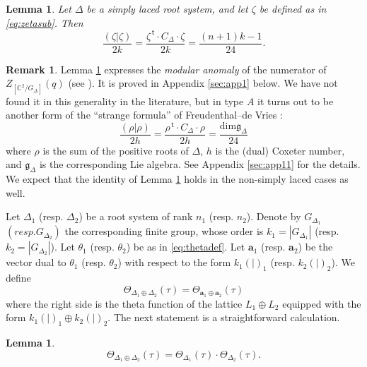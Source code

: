 \documentclass{article}
\newtheorem{lemma}[theorem]{Lemma}
\theoremstyle{definition}
\newtheorem{remark}[theorem]{Remark}
\newcommand{\CC} {{\mathbb C}}          %
\renewcommand{\top}{\,\mathsf{t}}
\begin{document}
\begin{lemma} Let $\Delta$ be a simply laced root system, and let $\zeta$ be 
defined as in \eqref{eq:zetasub}. Then
\[ \frac{(\zeta|\zeta)}{2k}=\frac{\zeta^ {\top} \cdot C_\Delta 
\cdot \zeta}{2k}=\frac{(n+1)k-1}{24}. \]
\label{lem:betalength}
\end{lemma}
\begin{remark}Lemma \ref{lem:betalength} expresses the \emph{modular anomaly} of the 
numerator of $Z_{[ \CC^2/G_\Delta]}(q)$ (see \cite[12.7.5]{kac1994infinite}). It is proved 
in Appendix \ref{sec:app1} below. We have not found it in this generality in the literature, 
but in type $A$ it turns out to be another form of the ``strange formula'' of 
Freudenthal--de Vries \cite{freudenthal1969linear}:
\[ \frac{(\rho|\rho)}{2h}=\frac{\rho^ {\top} \cdot C_\Delta 
\cdot \rho}{2h}=\frac{\mathrm{dim} \mathfrak{g}_{\Delta}}{24} \]
where $\rho$ is the sum of the positive roots of $\Delta$, $h$ is the (dual) Coxeter number, 
and $\mathfrak{g}_{\Delta}$ is the corresponding Lie algebra.
See Appendix \ref{sec:app11} for the details. We expect that the identity of Lemma 
\ref{lem:betalength} holds in the non-simply laced cases as well.
\end{remark}

Let $\Delta_1$ (resp. $\Delta_2$) be a root system of rank $n_1$ (resp. $n_2$). Denote by 
$G_{\Delta_1}$ $(resp. G_{\Delta_2})$ the corresponding finite group, whose order is 
$k_1=|G_{\Delta_1}|$ (resp. $k_2=|G_{\Delta_2}|$). Let 
$\theta_1$ (resp. $\theta_2$) be as in \eqref{eq:thetadef}.
Let
$\mathbf{a}_1$ (resp.  $\mathbf{a}_2$) be the vector dual to $\theta_1$ (resp. $\theta_2$) 
with respect to the form
$k_1(|)_1$ (resp. $k_2(|)_2$). We define
\[ \Theta_{\Delta_1 \oplus \Delta_2}(\tau)=\Theta_{\mathbf{a}_1 \oplus \mathbf{a}_2}(\tau)\]
where the right side is the theta function of the lattice $L_1 \oplus L_2$ equipped with the 
form $k_1(|)_1 \oplus k_2(|)_2$. The next statement is a straightforward calculation.

\begin{lemma}
\[ \Theta_{\Delta_1 \oplus \Delta_2}(\tau)=\Theta_{\Delta_1}(\tau)
\cdot \Theta_{\Delta_2}(\tau).\]
\end{lemma}
\end{document}
